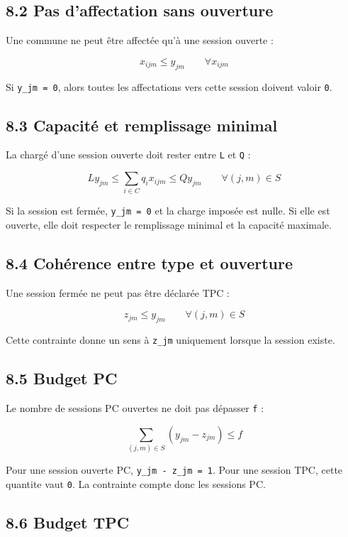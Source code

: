 \documentclass[11pt,a4paper]{article}
\begin{document}
\subsection{8.2 Pas d'affectation sans ouverture}

Une commune ne peut être affectée qu'à une session ouverte :

\[
x_{ijm} \leq y_{jm}
\qquad
\forall x_{ijm}
\]

Si \texttt{y\_jm = 0}, alors toutes les affectations vers cette session doivent valoir \texttt{0}.

\subsection{8.3 Capacité et remplissage minimal}

La chargé d'une session ouverte doit rester entre \texttt{L} et \texttt{Q} :

\[
L y_{jm}
\leq
\sum_{i\in C} q_i x_{ijm}
\leq
Q y_{jm}
\qquad
\forall (j,m)\in S
\]

Si la session est fermée, \texttt{y\_jm = 0} et la charge imposée est nulle. Si elle est ouverte, elle doit respecter le remplissage minimal et la capacité maximale.

\subsection{8.4 Cohérence entre type et ouverture}

Une session fermée ne peut pas être déclarée TPC :

\[
z_{jm} \leq y_{jm}
\qquad
\forall (j,m)\in S
\]

Cette contrainte donne un sens à \texttt{z\_jm} uniquement lorsque la session existe.

\subsection{8.5 Budget PC}

Le nombre de sessions PC ouvertes ne doit pas dépasser \texttt{f} :

\[
\sum_{(j,m)\in S} (y_{jm}-z_{jm}) \leq f
\]

Pour une session ouverte PC, \texttt{y\_jm - z\_jm = 1}. Pour une session TPC, cette quantite vaut \texttt{0}. La contrainte compte donc les sessions PC.

\subsection{8.6 Budget TPC}
\end{document}
